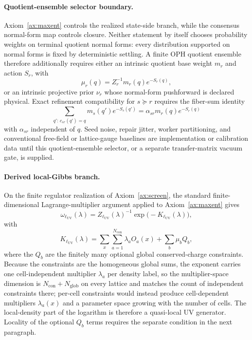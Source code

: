\documentclass[11pt]{article}
\begin{document}
\paragraph{Quotient-ensemble selector boundary.}
Axiom~\ref{ax:maxent} controls the realized state-side branch, while the consensus normal-form map controls closure. Neither statement by itself chooses probability weights on terminal quotient normal forms: every distribution supported on normal forms is fixed by deterministic settling. A finite OPH quotient ensemble therefore additionally requires either an intrinsic quotient base weight \(m_r\) and action \(S_r\), with
\[
\mu_r(q)=Z_r^{-1}m_r(q)e^{-S_r(q)},
\]
or an intrinsic projective prior \(\nu_r\) whose normal-form pushforward is declared physical. Exact refinement compatibility for \(s\succeq r\) requires the fiber-sum identity
\[
\sum_{q':\,c_{sr}(q')=q}m_s(q')e^{-S_s(q')}
=
\alpha_{sr}m_r(q)e^{-S_r(q)}
\]
with \(\alpha_{sr}\) independent of \(q\). Seed noise, repair jitter, worker partitioning, and conventional free-field or lattice-gauge baselines are implementation or calibration data until this quotient-ensemble selector, or a separate transfer-matrix vacuum gate, is supplied.

\paragraph{Derived local-Gibbs branch.}
On the finite regulator realization of Axiom~\ref{ax:screen}, the standard finite-dimensional Lagrange-multiplier argument applied to Axiom~\ref{ax:maxent} gives
\[
\omega_{\ell_{\mathrm{UV}}}(\lambda)
=
Z_{\ell_{\mathrm{UV}}}(\lambda)^{-1}\exp\!\bigl(-K_{\ell_{\mathrm{UV}}}(\lambda)\bigr),
\]
with
\[
K_{\ell_{\mathrm{UV}}}(\lambda)
=
\sum_x \sum_{a=1}^{N_{\mathrm{con}}}\lambda_a O_a(x)
+\sum_b \mu_b Q_b,
\]
where the \(Q_b\) are the finitely many optional global conserved-charge constraints. Because the constraints are the homogeneous global sums, the exponent carries one cell-independent multiplier \(\lambda_a\) per density label, so the multiplier-space dimension is \(N_{\mathrm{con}}+N_{\mathrm{glob}}\) on every lattice and matches the count of independent constraints there; per-cell constraints would instead produce cell-dependent multipliers \(\lambda_a(x)\) and a parameter space growing with the number of cells. The local-density part of the logarithm is therefore a quasi-local UV generator. Locality of the optional \(Q_b\) terms requires the separate condition in the next paragraph.
\end{document}
